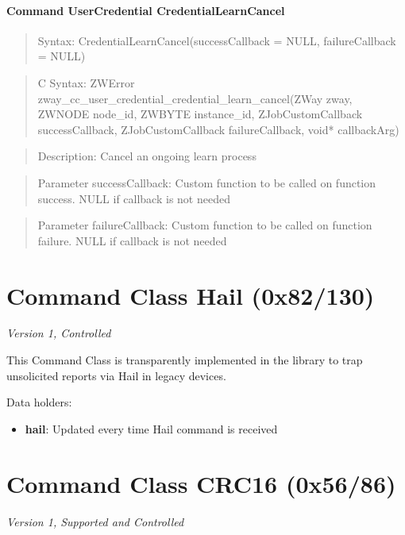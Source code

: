 \paragraph{Command UserCredential CredentialLearnCancel}
\begin{quote}Syntax: CredentialLearnCancel(successCallback = NULL, failureCallback = NULL)\end{quote}
\begin{quote}C Syntax: ZWError zway\_cc\_user\_credential\_credential\_learn\_cancel(ZWay zway, ZWNODE node\_id, ZWBYTE instance\_id, ZJobCustomCallback successCallback, ZJobCustomCallback failureCallback, void* callbackArg)\end{quote}
\begin{quote}Description: Cancel an ongoing learn process\end{quote}
\begin{quote}Parameter successCallback: Custom function to be called on function success. NULL if callback is not needed\end{quote}
\begin{quote}Parameter failureCallback: Custom function to be called on function failure. NULL if callback is not needed\end{quote}



\section{Command Class Hail (0x82/130)}

\textit{Version 1, Controlled}
\newline

This Command Class is transparently implemented in the library to trap unsolicited reports via Hail in legacy devices.
\newline

\noindent
Data holders:

\begin{itemize}
\item \textbf{hail}: Updated every time Hail command is received
\end{itemize}


\section{Command Class CRC16 (0x56/86)}

\textit{Version 1, Supported and Controlled}
\newline

